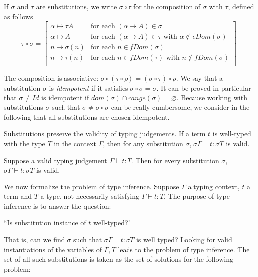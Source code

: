 \begin{defn} If $\sigma$ and $\tau$ are substitutions, we write $\sigma \circ \tau$ for the composition of $\sigma$ with $\tau$, defined as follows
		$$\tau \circ \sigma = \left[ \begin{array}{ll}
																			\alpha \mapsto \tau A & \text{for each } (\alpha \mapsto A) \in \sigma \\
																			\alpha \mapsto A & \text{for each } (\alpha \mapsto A) \in \tau \text{ with } \alpha \notin vDom(\sigma) \\
																			n \mapsto \sigma(n) & \text{for each } n \in fDom(\sigma) \\
																			n \mapsto \tau(n) & \text{for each } n \in fDom(\tau) \text{ with } n \notin fDom(\sigma) \\
																		\end{array} \right]$$
\end{defn}

The composition is associative: $\sigma \circ (\tau \circ \rho) = (\sigma \circ \tau) \circ \rho$. We say that a substitution
$\sigma$ is \textit{idempotent} if it satisfies $\sigma \circ \sigma = \sigma$. It can be proved in particular that $\sigma \neq Id$ is idempotent if $dom(\sigma) \cap range(\sigma) = \varnothing$. Because working with substitutions $\sigma$ such that
$\sigma \neq \sigma \circ \sigma$ can be really cumbersome, we consider in the following that all substitutions are chosen idempotent.

Substitutions preserve the validity of typing judgements. If a term $t$ is well-typed with the
type $T$ in the context $\Gamma$, then for any substitution $\sigma$, $\sigma \Gamma \vdash t : \sigma T$ is valid.

\begin{thm}
	\label{subs-judgement}
	Suppose a valid typing judgement $\Gamma \vdash t : T$. Then for every substitution $\sigma$, $\sigma \Gamma \vdash t : \sigma T$
	is valid.
\end{thm}

We now formalize the problem of type inference. 
Suppose $\Gamma$ a typing context, $t$ a term and $T$ a type, not necessarily satisfying $\Gamma \vdash t : T$. The purpose of type inference is to answer the question:
 \begin{center}
 	 ``Is  substitution instance of $t$ well-typed?"
 \end{center}
That is, can we find $\sigma$ such that $\sigma \Gamma \vdash t : \sigma T$ is well typed? Looking for valid instantiations of the
variables of $\Gamma, T$ leads to the problem of type inference. The set of all such substitutions is taken as the set of solutions
for the following problem:

